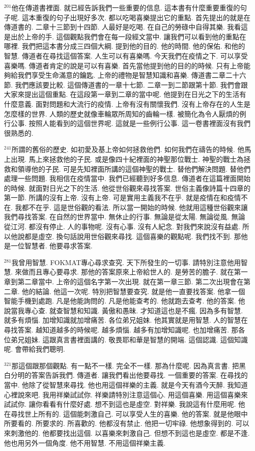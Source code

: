 \documentclass{book}
\begin{document}
$^{201}$他在傳道書裡面.
就已經告訴我們一些重要的信息.
這本書有什麼重要重復的句子呢.
這本重復的句子出現好多次.
都以吃喝喜樂提出它的重點.
首先提出的就是在傳道書的.
二章十三節到十四節.
人最好是吃喝.
在自己的勞碌中自得其樂.
我看這是出於上帝的手.
這個觀點我們會在每一段經文當中.
讓我們可以看到他的重點在哪裡.
我們把這本書分成三四個大綱.
提到他的目的.
他的時間.
他的保佑.
和他的智慧.
傳道者在尋找這個答案.
人生可以有喜樂嗎.
今天我們在疫情之下.
可以享受喜樂嗎.
傳道者肯定的說是可以有喜樂.
首先當他提到他的目的的時候.
只有上帝能夠給我們享受生命滿意的鑰匙.
上帝的禮物是智慧知識和喜樂.
傳道書二章二十六節.
我們應該要比較.
這個傳道書的一章十七節.
二章一到二節跟第十節.
我們會跟大家來提出這個重點.
在這段第一章到二章的當中呢.
他提到在日光之下的生活有什麼意義.
面對問題和大流行的疫情.
上帝有沒有關懷我們.
沒有上帝存在的人生是怎麼樣的世界.
人類的歷史就像車輪眾所周知的齒輪一樣.
被簡化為令人厭煩的例行公事.
按照人能看到的這個世界呢.
這就是一些例行公事.
這一卷書裡面沒有我們很熟悉的.

$^{241}$所謂的舊俗的歷史.
如初愛及基上帝如何拯救他們.
如何我們在禱告的時候.
他馬上出現.
馬上來拯救他的子民.
或是像四十紀裡面的神聖那位戰士.
神聖的戰士為拯救和領導他的子民.
可是先知裡面所講的這個神聖的戰士.
替他們解決問題.
替他們處理一些問題.
我相信在疫情當中.
我們已經聽到好多信息.
傳道者在這篇裡面開始的時候.
就面對日光之下的生活.
他從世俗觀來尋找答案.
世俗主義像詩篇十四章的第一節.
所講的沒有上帝.
沒有上帝.
可是實用主義我不在乎.
就是疫情在和疫情不在.
我都不在乎.
這是世俗觀的看法.
所以當一開始的時候.
他就用這種世俗觀來讓我們尋找答案.
在自然的世界當中.
無休止的行事.
無論是從太陽.
無論從風.
無論從江河.
都沒有停止.
人的事物呢.
沒有心事.
沒有人紀念.
對我們來說沒有益處.
所以他說都是虛空.
換句話說用世俗觀來尋找.
這個喜樂的觀點呢.
我們找不到.
那他是一位智慧者.
他要尋求答案.

$^{281}$我曾用智慧.
FOKMAT專心尋求查究.
天下所發生的一切事.
請特別注意他用智慧.
來做而且專心要尋求.
那他的答案原來上帝給世人的.
是勞苦的膽子.
就在第一章到第二章當中.
上帝的這個名字第一次出現.
就在第一章三節.
第二次出現會在第二章.
他的結論.
他這一次呢.
特別把智慧要查究.
就是他一直要找答案.
他拿一個智能手機到處跑.
凡是他能詢問的.
凡是他能查考的.
他就跑去查考.
他的答案.
他說當我專心查.
就查智慧和知識.
黃傲和愚昧.
才知道這也是不瘋.
因為多有智慧.
就多有煩惱.
加增知識就加增痛苦.
各位弟兄姐妹.
他其實就是用智慧.
人的智慧在尋找答案.
越知道越多的時候呢.
越多煩惱.
越多有加增知識呢.
也加增痛苦.
那各位弟兄姐妹.
這跟真言書裡面講的.
敬畏耶和華是智慧的開端.
這個認識.
這個知識呢.
會帶給我們聰明.

$^{321}$那這個跟那個觀點.
有一點不一樣.
完全不一樣.
那為什麼呢.
因為真言書.
把黑白分明的答案告訴我們.
傳道者.
讓我們看出他要尋找.
一個重要的答案.
在尋找的當中.
他除了從智慧來尋找.
他也用這個祥樂的主義.
就是今天有酒今天醉.
我知道心裡說來吧.
我用祥樂試試你.
祥樂請特別注意這個心.
用這個喜樂.
用這個喜樂來試試你.
讓你看看有什麼好處.
想不到這也是虛空.
對祥樂.
我說這有什麼用呢.
他在尋找世上所有的.
這個能刺激自己.
可以享受人生的喜樂.
他的答案.
就是他眼中所要看的.
所要求的.
所喜歡的.
他都沒有禁止.
他把一切牢祿.
他想象得到的.
可以來刺激他的.
他都要找出這個.
以喜樂來刺激自己.
但想不到這也是虛空.
都是不逢.
他也用另外一個角度.
他不用智慧.
不用這個祥樂主義.
\end{document}
